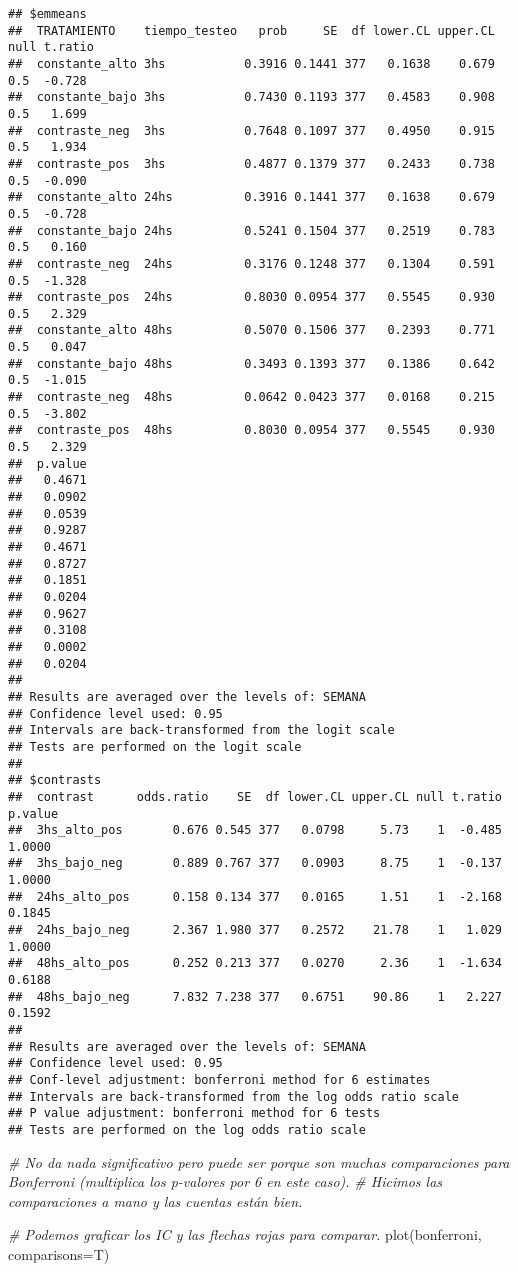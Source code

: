 \documentclass[
]{article}
\newenvironment{Shaded}{\begin{snugshade}}{\end{snugshade}}
\newcommand{\AttributeTok}[1]{\textcolor[rgb]{0.77,0.63,0.00}{#1}}
\newcommand{\CommentTok}[1]{\textcolor[rgb]{0.56,0.35,0.01}{\textit{#1}}}
\newcommand{\FunctionTok}[1]{\textcolor[rgb]{0.00,0.00,0.00}{#1}}
\newcommand{\NormalTok}[1]{#1}
\begin{document}
\begin{verbatim}
## $emmeans
##  TRATAMIENTO    tiempo_testeo   prob     SE  df lower.CL upper.CL null t.ratio
##  constante_alto 3hs           0.3916 0.1441 377   0.1638    0.679  0.5  -0.728
##  constante_bajo 3hs           0.7430 0.1193 377   0.4583    0.908  0.5   1.699
##  contraste_neg  3hs           0.7648 0.1097 377   0.4950    0.915  0.5   1.934
##  contraste_pos  3hs           0.4877 0.1379 377   0.2433    0.738  0.5  -0.090
##  constante_alto 24hs          0.3916 0.1441 377   0.1638    0.679  0.5  -0.728
##  constante_bajo 24hs          0.5241 0.1504 377   0.2519    0.783  0.5   0.160
##  contraste_neg  24hs          0.3176 0.1248 377   0.1304    0.591  0.5  -1.328
##  contraste_pos  24hs          0.8030 0.0954 377   0.5545    0.930  0.5   2.329
##  constante_alto 48hs          0.5070 0.1506 377   0.2393    0.771  0.5   0.047
##  constante_bajo 48hs          0.3493 0.1393 377   0.1386    0.642  0.5  -1.015
##  contraste_neg  48hs          0.0642 0.0423 377   0.0168    0.215  0.5  -3.802
##  contraste_pos  48hs          0.8030 0.0954 377   0.5545    0.930  0.5   2.329
##  p.value
##   0.4671
##   0.0902
##   0.0539
##   0.9287
##   0.4671
##   0.8727
##   0.1851
##   0.0204
##   0.9627
##   0.3108
##   0.0002
##   0.0204
## 
## Results are averaged over the levels of: SEMANA 
## Confidence level used: 0.95 
## Intervals are back-transformed from the logit scale 
## Tests are performed on the logit scale 
## 
## $contrasts
##  contrast      odds.ratio    SE  df lower.CL upper.CL null t.ratio p.value
##  3hs_alto_pos       0.676 0.545 377   0.0798     5.73    1  -0.485  1.0000
##  3hs_bajo_neg       0.889 0.767 377   0.0903     8.75    1  -0.137  1.0000
##  24hs_alto_pos      0.158 0.134 377   0.0165     1.51    1  -2.168  0.1845
##  24hs_bajo_neg      2.367 1.980 377   0.2572    21.78    1   1.029  1.0000
##  48hs_alto_pos      0.252 0.213 377   0.0270     2.36    1  -1.634  0.6188
##  48hs_bajo_neg      7.832 7.238 377   0.6751    90.86    1   2.227  0.1592
## 
## Results are averaged over the levels of: SEMANA 
## Confidence level used: 0.95 
## Conf-level adjustment: bonferroni method for 6 estimates 
## Intervals are back-transformed from the log odds ratio scale 
## P value adjustment: bonferroni method for 6 tests 
## Tests are performed on the log odds ratio scale
\end{verbatim}

\begin{Shaded}
\begin{Highlighting}[]
\CommentTok{\# No da nada significativo pero puede ser porque son muchas comparaciones para Bonferroni (multiplica los p{-}valores por 6 en este caso).}
\CommentTok{\# Hicimos las comparaciones a mano y las cuentas están bien.}

\CommentTok{\# Podemos graficar los IC y las flechas rojas para comparar.}
\FunctionTok{plot}\NormalTok{(bonferroni, }\AttributeTok{comparisons=}\NormalTok{T)}
\end{Highlighting}
\end{Shaded}
\end{document}
